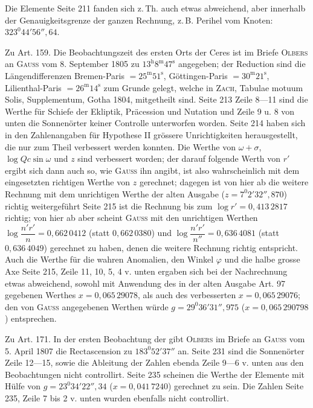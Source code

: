 Die Elemente Seite 211 fanden sich z.\,Th. auch etwas abweichend, aber innerhalb der
Genauigkeitsgrenze der ganzen Rechnung, z.\,B. Perihel vom Knoten: $323^0 44' 56''{,}64$.

Zu Art. 159. Die Beobachtungszeit des ersten Orts der Ceres ist im Briefe \textsc{Olbers}
an \textsc{Gauss} vom 8. September 1805 zu $13^{\mathrm h} 8^{\mathrm m} 47^{\mathrm s}$
angegeben; der Reduction sind die Längendifferenzen Bremen-Paris $= 25^{\mathrm m}
51^{\mathrm s}$, Göttingen-Paris $= 30^{\mathrm m} 21^{\mathrm s}$, Lilienthal-Paris $=
26^{\mathrm m} 14^{\mathrm s}$ zum Grunde gelegt, welche in \textsc{Zach}, Tabulae motuum
Solis, Supplementum, Gotha 1804, mitgetheilt sind. Seite 213 Zeile 8---11 sind die Werthe
für Schiefe der Ekliptik, Präcession und Nutation und Zeile 9 u. 8 von unten die
Sonnenörter keiner Controlle unterworfen worden. Seite 214 haben sich in den
Zahlenangaben für Hypothese II grössere Unrichtigkeiten herausgestellt, die nur zum Theil
verbessert werden konnten. Die Werthe von $\omega+\sigma$, $\log Qc\sin\omega$ und $z$
sind verbessert worden; der darauf folgende Werth von $r'$ ergibt sich dann auch so, wie
\textsc{Gauss} ihn angibt, ist also wahrscheinlich mit dem eingesetzten richtigen Werthe
von $z$ gerechnet; dagegen ist von hier ab die weitere Rechnung mit dem unrichtigen
Werthe der alten Ausgabe ($z = 7^0 2' 32''{,}870$) richtig weitergeführt Seite 215 ist die
Rechnung bis zum $\log r' = 0{,}413\,2817$ richtig; von hier ab aber scheint
\textsc{Gauss} mit den unrichtigen Werthen $\log\dfrac{n'r'}{n} = 0{,}662\,0412$ (statt
$0{,}662\,0380$) und $\log\dfrac{n'r'}{n''} = 0{,}636\,4081$ (statt $0{,}636\,4049$)
gerechnet zu haben, denen die weitere Rechnung richtig entspricht. Auch die Werthe für die
wahren Anomalien, den Winkel $\varphi$ und die halbe grosse Axe Seite 215, Zeile 11, 10,
5, 4 v. unten ergaben sich bei der Nachrechnung etwas abweichend, sowohl mit Anwendung des
in der alten Ausgabe Art. 97 gegebenen
Werthes $x = 0{,}065\,29078$, als auch des verbesserten $x = 0{,}065\,29076$; den von
\textsc{Gauss} angegebenen Werthen würde $g = 29^0 36' 31''{,}975$ ($x = 0{,}065\,290798$)
entsprechen.

Zu Art. 171. In der ersten Beobachtung der  gibt \textsc{Olbers} im Briefe an
\textsc{Gauss} vom 5. April 1807 die Rectascension zu $183^0 52' 37''$ an. Seite 231 sind
die Sonnenörter Zeile 12---15, sowie die Ableitung der Zahlen ebenda Zeile 9---6 v. unten
aus den Beobachtungen nicht controllirt. Seite 235 scheinen die Werthe der Elemente mit
Hülfe von $g = 23^0 34' 22''{,}34$ ($x = 0{,}041\,7240$) gerechnet zu sein. Die Zahlen Seite
235, Zeile 7 bis 2 v. unten wurden ebenfalls nicht controllirt.

